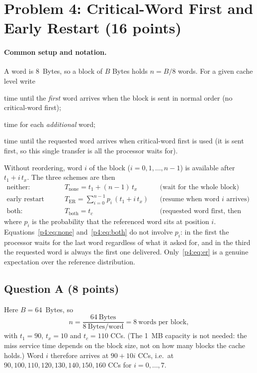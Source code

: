 \section{Problem 4: Critical-Word First and Early Restart (16 points)}

\paragraph{Common setup and notation.}
A word is 8~Bytes, so a block of $B$ Bytes holds $n=B/8$ words. For a given cache
level write
\begin{description}\itemsep2pt
  \item[$t_1$] time until the \emph{first} word arrives when the block is sent in
        normal order (no critical-word first);
  \item[$t_x$] time for each \emph{additional} word;
  \item[$t_c$] time until the requested word arrives when critical-word first is
        used (it is sent first, so this single transfer is all the processor waits for).
\end{description}
Without reordering, word $i$ of the block ($i=0,1,\dots,n-1$) is available after
$t_1+i\,t_x$. The three schemes are then
\begin{align}
  \text{neither:}\quad & T_{\text{none}} = t_1+(n-1)\,t_x
    &&\text{(wait for the whole block)} \label{p4:eq:none}\\
  \text{early restart only:}\quad & T_{\text{ER}} = \sum_{i=0}^{n-1} p_i\,(t_1+i\,t_x)
    &&\text{(resume when word $i$ arrives)} \label{p4:eq:er}\\
  \text{both:}\quad & T_{\text{both}} = t_c
    &&\text{(requested word first, then resume)} \label{p4:eq:both}
\end{align}
where $p_i$ is the probability that the referenced word sits at position $i$.
Equations~\eqref{p4:eq:none} and~\eqref{p4:eq:both} do not involve $p_i$: in the first
the processor waits for the last word regardless of what it asked for, and in the third
the requested word is always the first one delivered. Only~\eqref{p4:eq:er} is a genuine
expectation over the reference distribution.

\subsection*{Question A (8 points)}

Here $B=64$~Bytes, so
\[
  n=\frac{64\ \text{Bytes}}{8\ \text{Bytes/word}}=8\ \text{words per block},
\]
with $t_1=90$, $t_x=10$ and $t_c=110$ CCs. (The 1~MB capacity is not needed: the miss
service time depends on the block size, not on how many blocks the cache holds.) Word
$i$ therefore arrives at $90+10i$ CCs, i.e.\ at
$90,100,110,120,130,140,150,160$ CCs for $i=0,\dots,7$.

